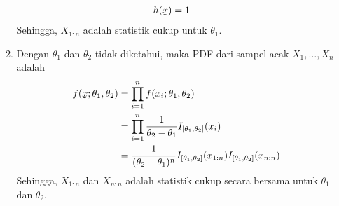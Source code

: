 \documentclass{exam}
\begin{document}
\begin{enumerate}
\begin{solution}
\begin{enumerate}
\begin{align*}
                h(\underaccent{\tilde}{x}) &= 1
            \end{align*}
            Sehingga, \(X_{1:n}\) adalah statistik cukup untuk \(\theta_1\).
            \item Dengan \(\theta_1\) dan \(\theta_2\) tidak diketahui, maka PDF dari sampel acak \(X_1,\dots,X_n\) adalah
            \begin{align*}
                f(\underaccent{\tilde}{x};\theta_1,\theta_2) &= \prod_{i=1}^n f(x_i;\theta_1,\theta_2)\\
                &= \prod_{i=1}^n \frac{1}{\theta_2-\theta_1}I_{[\theta_1,\theta_2]}(x_i)\\
                &= \frac{1}{(\theta_2-\theta_1)^n}I_{[\theta_1,\theta_2]}(x_{1:n})I_{[\theta_1,\theta_2]}(x_{n:n})
            \end{align*}
            Sehingga, \(X_{1:n}\) dan \(X_{n:n}\) adalah statistik cukup secara bersama untuk \(\theta_1\) dan \(\theta_2\).
        \end{enumerate}
    \end{solution}
\end{enumerate}
\end{document}
